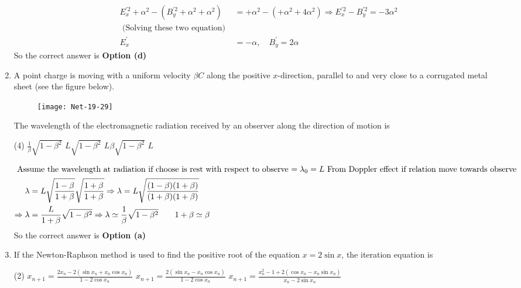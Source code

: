 \begin{enumerate}
\begin{answer}
\begin{align*}
	E_{x}^{\prime 2}+\alpha^{2}-\left(B_{y}^{\prime 2}+\alpha^{2}+\alpha^{2}\right)&=+\alpha^{2}-\left(+\alpha^{2}+4 \alpha^{2}\right) \Rightarrow E_{x}^{\prime 2}-B_{y}^{\prime 2}=-3 \alpha^{2}\\
	\text { (Solving these two equation) }&\\
	E_{x}^{\prime}&=-\alpha, \quad B_{y}^{\prime}=2 \alpha
	\end{align*}
		So the correct answer is \textbf{Option (d)}
\end{answer}
\item  A point charge is moving with a uniform velocity $\beta C$ along the positive $x$-direction, parallel to and very close to a corrugated metal sheet (see the figure below).
\begin{figure}[H]
	\centering
	\texttt{[image: Net-19-29]}
\end{figure}
The wavelength of the electromagnetic radiation received by an observer along the direction of motion is
 \begin{tasks}(4)
	\task[\textbf{a.}]$\frac{1}{\beta} \sqrt{1-\beta^{2}}$
	\task[\textbf{b.}]$L \sqrt{1-\beta^{2}}$
	\task[\textbf{c.}]$L \beta \sqrt{1-\beta^{2}}$
	\task[\textbf{d.}] $L$
\end{tasks}
\begin{answer}
	\begin{align*}
	\intertext{ Assume the wavelength at radiation if choose is rest with respect to observe $=\lambda_{0}=L$ From Doppler effect if relation move towards observe}
	\lambda&=L \sqrt{\frac{1-\beta}{1+\beta}} \sqrt{\frac{1+\beta}{1+\beta}} \Rightarrow \lambda=L \sqrt{\frac{(1-\beta)(1+\beta)}{(1+\beta)(1+\beta)}} \\
	\Rightarrow \lambda&=\frac{L}{1+\beta} \sqrt{1-\beta^{2}} \Rightarrow \lambda \simeq \frac{1}{\beta} \sqrt{1-\beta^{2}} \qquad 1+\beta \simeq \beta
	\end{align*}
	So the correct answer is \textbf{Option (a)}
\end{answer}
\item If the Newton-Raphson method is used to find the positive root of the equation $x=2 \sin x$, the iteration equation is
 \begin{tasks}(2)
	\task[\textbf{a.}]$x_{n+1}=\frac{2 x_{n}-2\left(\sin x_{n}+x_{n} \cos x_{n}\right)}{1-2 \cos x_{n}}$
	\task[\textbf{b.}]$x_{n+1}=\frac{2\left(\sin x_{n}-x_{n} \cos x_{n}\right)}{1-2 \cos x_{n}}$
	\task[\textbf{c.}] $x_{n+1}=\frac{x_{n}^{2}-1+2\left(\cos x_{n}-x_{n} \sin x_{n}\right)}{x_{n}-2 \sin x_{n}}$

\end{tasks}
\end{enumerate}
